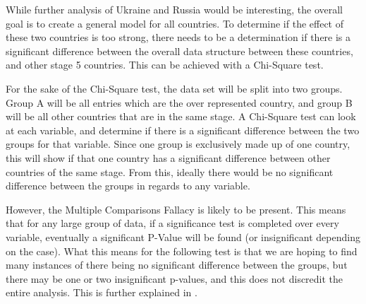 \documentclass{article} %
\begin{document}
While further analysis of Ukraine and Russia would be interesting, the overall goal is to create a general model for all countries. To determine if the effect of these two countries is too strong, there needs to be a determination if there is a significant difference between the overall data structure between these countries, and other stage 5 countries. This can be achieved with a Chi-Square test.

For the sake of the Chi-Square test, the data set will be split into two groups. Group A will be all entries which are the over represented country, and group B will be all other countries that are in the same stage. A Chi-Square test can look at each variable, and determine if there is a significant difference between the two groups for that variable. Since one group is exclusively made up of one country, this will show if that one country has a significant difference between other countries of the same stage. From this, ideally there would be no significant difference between the groups in regards to any variable. 

However, the Multiple Comparisons Fallacy is likely to be present. This means that for any large group of data, if a significance test is completed over every variable, eventually a significant P-Value will be found (or insignificant depending on the case). What this means for the following test is that we are hoping to find many instances of there being no significant difference between the groups, but there may be one or two insignificant p-values, and this does not discredit the entire analysis. This is further explained in \cite{Fallacy}.
\end{document}
